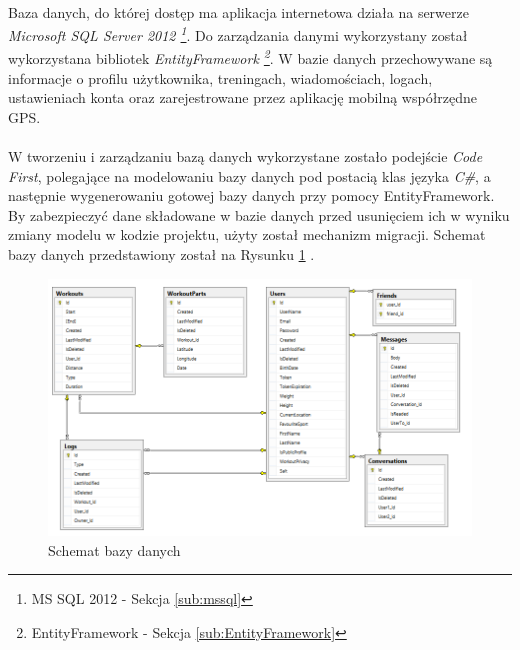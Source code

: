 \paragraph{} %
\label{par:}
Baza danych, do której dostęp ma aplikacja internetowa działa na serwerze \textit{Microsoft SQL Server 2012 \footnote{MS SQL 2012 - Sekcja \ref{sub:mssql}}}. Do zarządzania danymi wykorzystany został wykorzystana bibliotek \textit{EntityFramework \footnote{EntityFramework - Sekcja \ref{sub:EntityFramework}}}. W bazie danych przechowywane są informacje o profilu użytkownika, treningach, wiadomościach, logach, ustawieniach konta oraz zarejestrowane przez aplikację mobilną współrzędne GPS.

\paragraph{} %
\label{par:}
W tworzeniu i zarządzaniu bazą danych wykorzystane zostało podejście \textit{Code First}, polegające na modelowaniu bazy danych pod postacią klas języka \textit{C\#}, a następnie wygenerowaniu gotowej bazy danych przy pomocy EntityFramework. By zabezpieczyć dane składowane w bazie danych przed usunięciem ich w wyniku zmiany modelu w kodzie projektu, użyty został mechanizm migracji. 
Schemat bazy danych przedstawiony został na Rysunku \ref{fig:database} .


\label{sub:schemat_bazy_danych}
\begin{figure}[ht]
	\centering
		\includegraphics[width=1\linewidth]{assets/database.png}
	\caption{Schemat bazy danych}
	\label{fig:database}
\end{figure}


